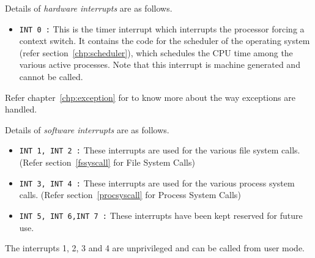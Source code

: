 Details of \emph{hardware interrupts} are as follows.
\begin{itemize}
	\item \texttt{INT 0 :} This is the timer interrupt  which interrupts the processor forcing a context switch. It contains the code for the scheduler of the operating system (refer section~\ref{chp:scheduler}), which schedules the CPU time among the various active processes. Note that this interrupt is machine generated and cannot be called.
\end{itemize}
Refer chapter~\ref{chp:exception} for to know more about the way exceptions are handled.

Details of \emph{software interrupts} are as follows.
\begin{itemize}
	\item \texttt{INT 1, INT 2 :} These interrupts are used for the various file system calls. (Refer section~\ref{fssyscall} for File System Calls)
	\item \texttt{INT 3, INT 4 :} These interrupts are used for the various process system calls. (Refer section~\ref{procsyscall} for Process System Calls)
	\item \texttt{INT 5, INT 6,INT 7 :} These interrupts have been kept reserved for future use.
\end{itemize}
The interrupts 1, 2, 3 and 4  are unprivileged and can be called from user mode.

